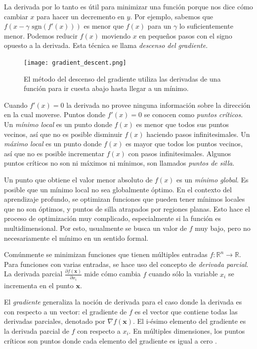 La derivada por lo tanto es útil para minimizar una función porque nos dice
cómo cambiar $x$ para hacer un decremento en $y$. Por ejemplo, sabemos que
$f(x - \gamma  \text{ sgn} (f'(x)))$ es menor que $f(x)$ para un $\gamma$ lo
suficientemente menor. Podemos reducir $f(x)$ moviendo $x$ en pequeños pasos
con el signo opuesto a la derivada. Esta técnica se llama \textit{descenso del gradiente}.

\begin{figure}[ht]
    \centering
    \texttt{[image: gradient\_descent.png]}
    \caption{El método del descenso del gradiente utiliza las derivadas de una función para ir cuesta abajo hasta llegar a un mínimo.}
    \label{fig:gradient_descent_first_example}
\end{figure}

Cuando $f'(x) = 0$ la derivada no provee ninguna información sobre la dirección
en la cual moverse. Puntos donde $f'(x) = 0$ se conocen como 
\textit{puntos críticos}. Un \textit{mínimo local} es un punto donde $f(x)$ es
menor que todos sus puntos vecinos, así que no es posible 
disminuir $f(x)$ haciendo pasos infinitesimales. Un \textit{máximo local} es
un punto donde $f(x)$ es mayor que todos los puntos vecinos, así que no es posible
incrementar $f(x)$ con pasos infinitesimales. Algunos puntos críticos no son
ni máximos ni mínimos, son llamados \textit{puntos de silla}.

Un punto que obtiene el valor menor absoluto de $f(x)$ es un \textit{mínimo global}.
Es posible que un mínimo local no sea globalmente óptimo. En el contexto
del aprendizaje profundo, se optimizan funciones que 
pueden tener mínimos locales que no son óptimos, y puntos de silla 
atrapados por regiones planas. Esto hace el proceso de optimización
muy complicado, especialmente si la función es multidimensional.
Por esto, usualmente se busca un valor de $f$ muy bajo, pero
no necesariamente el mínimo en un sentido formal.

Comúnmente se minimizan funciones que tienen múltiples entradas 
$f: \mathbb{R}^n \rightarrow \mathbb{R}$. Para funciones con varias entradas,
se hace uso del concepto de \textit{derivada parcial}. La derivada
parcial $\frac{\partial f(\mathbf{x})}{\partial x_i} $ mide cómo
cambia $f$ cuando sólo la variable $x_i$ se incrementa en el punto $\mathbf{x}$.\\

\begin{remark}
El \textit{gradiente} generaliza la noción de derivada para el caso
donde la derivada es con respecto a un vector: el gradiente de $f$ es el
vector que contiene todas las derivadas parciales, denotado por $\nabla f(\mathbf{x})$. El i-ésimo elemento del gradiente es la 
derivada parcial de $f$ con respecto a $x_i$. En múltiples dimensiones,
los puntos críticos son puntos donde cada elemento del gradiente es igual 
a cero \cite{iangoodfellowyoshuabengioaaroncourville2017}.\\
\end{remark}

